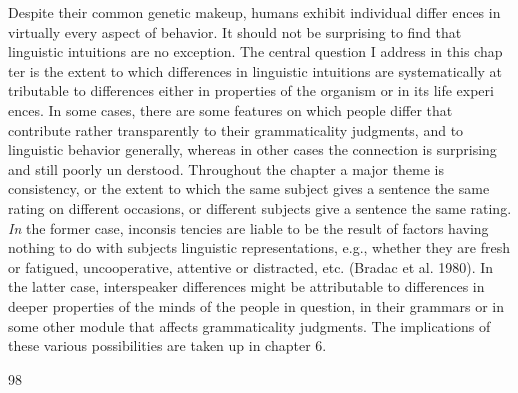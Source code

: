 \begin{styleTextbody}
Despite their common genetic makeup, humans exhibit individual differ\- ences in virtually every aspect of behavior. It should not be surprising to find that linguistic intuitions are no exception. The central question I address in this chap\- ter is the extent to which differences in linguistic intuitions are systematically at\- tributable to differences either in properties of the organism or in its life experi\- ences. In some cases, there are some features on which people differ that contribute rather transparently to their grammaticality judgments, and to linguistic behavior generally, whereas in other cases the connection is surprising and still poorly un\- derstood. Throughout the chapter a major theme is consistency, or the extent to which the same subject gives a sentence the same rating on different occasions, or different subjects give a sentence the same rating. \textit{In}\textit{ }the former case, inconsis\- tencies are liable to be the result of factors having nothing to do with subjects{\textquotesingle} linguistic representations, e.g., whether they are fresh or fatigued, uncooperative, attentive or distracted, etc. (Bradac et al. 1980). In the latter case, interspeaker differences might be attributable to differences in deeper properties of the minds of the people in question, in their grammars or in some other module that affects grammaticality judgments. The implications of these various possibilities are taken up in chapter 6.
\end{styleTextbody}


\begin{styleTextbody}
98
\end{styleTextbody}



